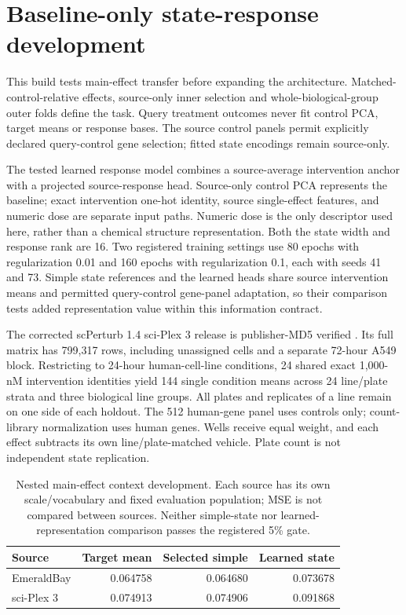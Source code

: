 \section{Baseline-only state-response development}

This build tests main-effect transfer before expanding the architecture. Matched-control-relative effects, source-only inner selection and whole-biological-group outer folds define the task. Query treatment outcomes never fit control PCA, target means or response bases. The source control panels permit explicitly declared query-control gene selection; fitted state encodings remain source-only.

The tested learned response model combines a source-average intervention anchor with a projected source-response head. Source-only control PCA represents the baseline; exact intervention one-hot identity, source single-effect features, and numeric dose are separate input paths. Numeric dose is the only descriptor used here, rather than a chemical structure representation. Both the state width and response rank are 16. Two registered training settings use 80 epochs with regularization 0.01 and 160 epochs with regularization 0.1, each with seeds 41 and 73. Simple state references and the learned heads share source intervention means and permitted query-control gene-panel adaptation, so their comparison tests added representation value within this information contract.

The corrected scPerturb 1.4 sci-Plex 3 release is publisher-MD5 verified \citep{srivatsan2020state,scperturb2024state}. Its full matrix has 799,317 rows, including unassigned cells and a separate 72-hour A549 block. Restricting to 24-hour human-cell-line conditions, 24 shared exact 1,000-nM intervention identities yield 144 single condition means across 24 line/plate strata and three biological line groups. All plates and replicates of a line remain on one side of each holdout. The 512 human-gene panel uses controls only; count-library normalization uses human genes. Wells receive equal weight, and each effect subtracts its own line/plate-matched vehicle. Plate count is not independent state replication.

\begin{table}[ht]\centering\normalsize\begin{tabular}{lrrr}\toprule Source & Target mean & Selected simple & Learned state \\ \midrule

EmeraldBay & 0.064758 & 0.064680 & 0.073678 \\

sci-Plex 3 & 0.074913 & 0.074906 & 0.091868 \\

\bottomrule\end{tabular}\caption{Nested main-effect context development. Each source has its own scale/vocabulary and fixed evaluation population; MSE is not compared between sources. Neither simple-state nor learned-representation comparison passes the registered 5\% gate.}\end{table}

